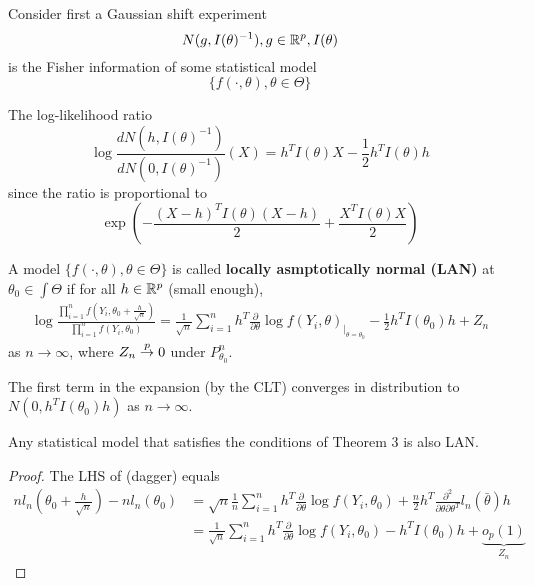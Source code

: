 Consider first a Gaussian shift experiment
\begin{equation}
  \label{eq:84}
  N(g, I(\theta)^{-1}), g \in \mathbb{R}^{p}, I(\theta)
\end{equation} is the Fisher information of some statistical model
\begin{equation}
  \label{eq:85}
  \{ f(\cdot, \theta), \theta \in \Theta \}
\end{equation}

The log-likelihood ratio
\begin{equation}
  \label{eq:86}
  \log \frac{dN(h, I(\theta)^{-1})}{dN(0, I(\theta)^{-1})}(X) = h^{T}
  I(\theta)X - \frac{1}{2}h^{T}I(\theta) h
\end{equation} since the ratio is proportional to
\begin{equation}
  \label{eq:87}
  \exp \left( - \frac{(X-h)^{T} I(\theta)(X-h)}{2} +
    \frac{X^{T}I(\theta)X}{2} \right)
\end{equation}

\begin{defn}
  \label{defn:parametric_statistical_models:10}
  A model $\{ f(\cdot, \theta), \theta \in \Theta \}$ is called
  \textbf{locally asmptotically normal (LAN)} at $\theta_{0} \in \int
  \Theta$ if for all $h \in \mathbb{R}^{p}$ (small enough),
  \begin{align}
    \label{eq:88}
    \log \frac{\prod_{i=1}^{n} f(Y_{i}, \theta_{0} +
      \frac{h}{\sqrt{n}})}{\prod_{i=1}^{n} f(Y_{i}, \theta_{0})} =
    \frac{1}{\sqrt{n}} \sum_{i=1}^{n} h^{T} \frac{\partial}{\partial
      \theta} \log f(Y_{i}, \theta)_{|_{\theta = \theta_{0}}} -
    \frac{1}{2} h^{T} I(\theta_{0}) h + Z_{n}
  \end{align} as $n \rightarrow \infty$, where $Z_{n} \overset{p}{\rightarrow} 0$ under $P_{\theta_{0}}^{n}$.
\end{defn}

\begin{remark}
  The first term in the expansion (by the CLT) converges in
  distribution to $N(0, h^{T} I(\theta_{0}) h)$ as $n \rightarrow
  \infty$.
\end{remark}


\begin{proposition}
  Any statistical model that satisfies the conditions of Theorem 3 is
  also LAN.
\end{proposition}

\begin{proof}
  The LHS of (dagger)  equals
  \begin{align}
    \label{eq:89}
    n l_{n}(\theta_{0} + \frac{h}{\sqrt{n}}) - n l_{n}(\theta_{0}) &=
    \sqrt{n} \frac{1}{n} \sum_{i=1}^{n} h^{T} \frac{\partial}{\partial
    \theta} \log f(Y_{i}, \theta_{0}) + \frac{n}{2} h^{T}
  \frac{\partial^{2}}{\partial \theta \partial \theta^{T}} l_{n}(\bar
  \theta) h  \\
  &= \frac{1}{\sqrt{n}} \sum_{i=1}^{n} h^{T} \frac{\partial}{\partial
    \theta} \log f(Y_{i}, \theta_{0}) - h^{T}I(\theta_{0})h + \underbrace{o_{p}(1)}_{Z_{n}}
  \end{align}
\end{proof}

